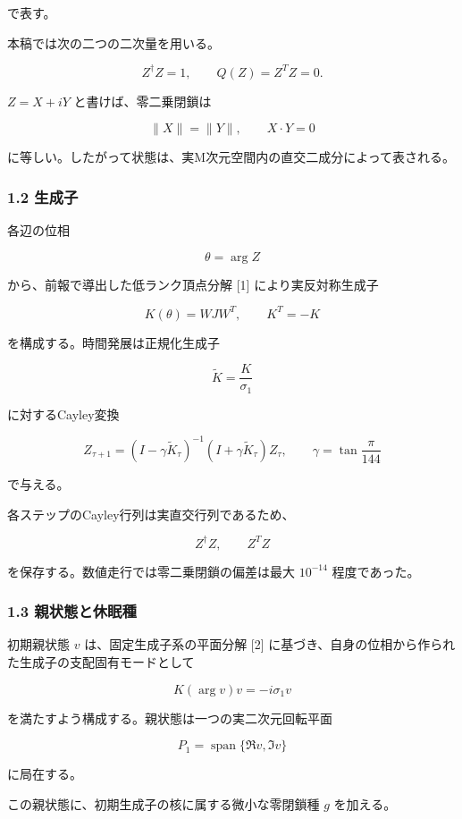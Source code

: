\documentclass[
  a4paper,
]{ltjsarticle}
\begin{document}
で表す。

本稿では次の二つの二次量を用いる。

\[
Z^\dagger Z=1,
\qquad
Q(Z)=Z^T Z=0.
\]

\(Z=X+iY\) と書けば、零二乗閉鎖は

\[
\|X\|=\|Y\|,
\qquad
X\cdot Y=0
\]

に等しい。したがって状態は、実M次元空間内の直交二成分によって表される。

\subsubsection{1.2 生成子}\label{ux751fux6210ux5b50}

各辺の位相

\[
\theta=\arg Z
\]

から、前報で導出した低ランク頂点分解 {[}1{]} により実反対称生成子

\[
K(\theta)=WJW^T,
\qquad
K^T=-K
\]

を構成する。時間発展は正規化生成子

\[
\widetilde K=\frac{K}{\sigma_1}
\]

に対するCayley変換

\[
Z_{\tau+1}
=
\left(I-\gamma\widetilde K_\tau\right)^{-1}
\left(I+\gamma\widetilde K_\tau\right)Z_\tau,
\qquad
\gamma=\tan\frac{\pi}{144}
\]

で与える。

各ステップのCayley行列は実直交行列であるため、

\[
Z^\dagger Z,
\qquad
Z^T Z
\]

を保存する。数値走行では零二乗閉鎖の偏差は最大 \(10^{-14}\)
程度であった。

\subsubsection{1.3
親状態と休眠種}\label{ux89aaux72b6ux614bux3068ux4f11ux7720ux7a2e}

初期親状態 \(v\) は、固定生成子系の平面分解 {[}2{]}
に基づき、自身の位相から作られた生成子の支配固有モードとして

\[
K(\arg v)v=-i\sigma_1 v
\]

を満たすよう構成する。親状態は一つの実二次元回転平面

\[
P_1=\operatorname{span}\{\Re v,\Im v\}
\]

に局在する。

この親状態に、初期生成子の核に属する微小な零閉鎖種 \(g\) を加える。
\end{document}
